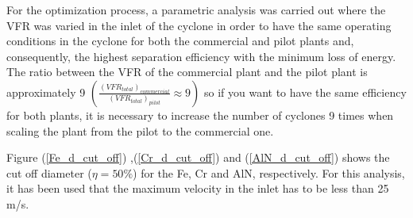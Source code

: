 For the optimization process, a parametric analysis was carried out where the VFR was varied in the inlet of the cyclone in order to have the same operating conditions in the cyclone for both the commercial and pilot plants and, consequently, the highest separation efficiency with the minimum loss of energy. The ratio between the VFR of the commercial plant and the pilot plant is approximately 9 $\left( \frac{(VFR_{total})_{commercial}}{(VFR_{total})_{pilot}} \approx 9 \right )$ so if you want to have the same efficiency for both plants, it is necessary to increase the number of cyclones 9 times when scaling the plant from the pilot to the commercial one.


Figure (\ref{Fe_d_cut_off}) ,(\ref{Cr_d_cut_off}) and (\ref{AlN_d_cut_off}) shows the cut off diameter ($\eta=50\%$)  for the Fe, Cr and AlN, respectively.  For this analysis, it has been used that the maximum velocity in the inlet has to be less than 25 m/s.

